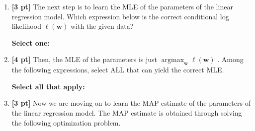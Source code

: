 \documentclass{article}
\renewcommand{\circle}{\tikz\draw[black] (0,0) circle (1ex);}
\newcommand{\argmax}{\mathop{\mathrm{argmax}}}
\begin{document}
\begin{enumerate}
    \item \textbf{[3 pt]} The next step is to learn the MLE of the parameters of the linear regression model. Which expression below is the correct conditional log likelihood $\ell(\mathbf{w})$ with the given data?

    \textbf{Select one:}
    
    \item \textbf{[4 pt]} Then, the MLE of the parameters is just  $\argmax_{\mathbf{w}} \ell(\mathbf{w})$ . Among the following expressions, select ALL that can yield the correct MLE. 

    \textbf{Select all that apply:}
    
    \item \textbf{[3 pt]} Now we are moving on to learn the MAP estimate of the parameters of the linear regression model. The MAP estimate is obtained through solving the following optimization problem.


\end{enumerate}
\end{document}
